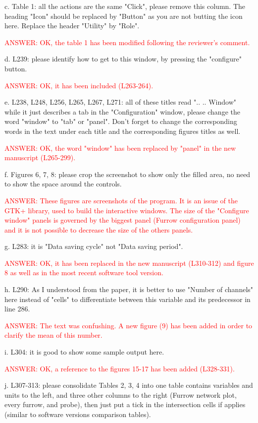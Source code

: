 \documentclass[a4paper]{article}
\begin{document}
c. Table 1: all the actions are the same "Click", please remove this column. The heading "Icon" should be replaced by "Button" as you are not butting the icon here. Replace the header "Utility" by "Role".

\textcolor{red}{ANSWER: OK, the table 1 has been modified following the
reviewer's comment.}

d. L239: please identify how to get to this window, by pressing the "configure" button.

\textcolor{red}{ANSWER: OK, it has been included (L263-264).}

e. L238, L248, L256, L265, L267, L271: all of these titles read ".. .. Window" while it just describes a tab in the "Configuration" window, please change the word "window" to "tab" or "panel". Don't forget to change the corresponding words in the text under each title and the corresponding figures titles as well.

\textcolor{red}{ANSWER: OK, the word "window" has been replaced by "panel" in
the new manuscript (L265-299).}

f. Figures 6, 7, 8: please crop the screenshot to show only the filled area, no need to show the space around the controls.

\textcolor{red}{ANSWER: These figures are screenshots of the program. It is an
issue of the GTK+ library, used to build the interactive windows. The size of
the "Configure window" panels is governed by the biggest panel (Furrow
configuration panel) and it is not possible to decrease the size of the others
panels.}

g. L283: it is "Data saving cycle" not "Data saving period".

\textcolor{red}{ANSWER: OK, it has been replaced in the new manuscript
(L310-312) and figure 8 as well as in the most recent software tool version.}

h. L290: As I understood from the paper, it is better to use "Number of channels" here instead of "cells" to differentiate between this variable and its predecessor in line 286.

\textcolor{red}{ANSWER: The text was confushing. A new figure (9) has been
added in order to clarify the mean of this number.}

i. L304: it is good to show some sample output here.

\textcolor{red}{ANSWER: OK, a reference to the figures 15-17 has been added
(L328-331).}

j. L307-313: please consolidate Tables 2, 3, 4 into one table contains variables and units to the left, and three other columns to the right (Furrow network plot, every furrow, and probe), then just put a tick in the intersection cells if applies (similar to software versions comparison tables).
\end{document}
